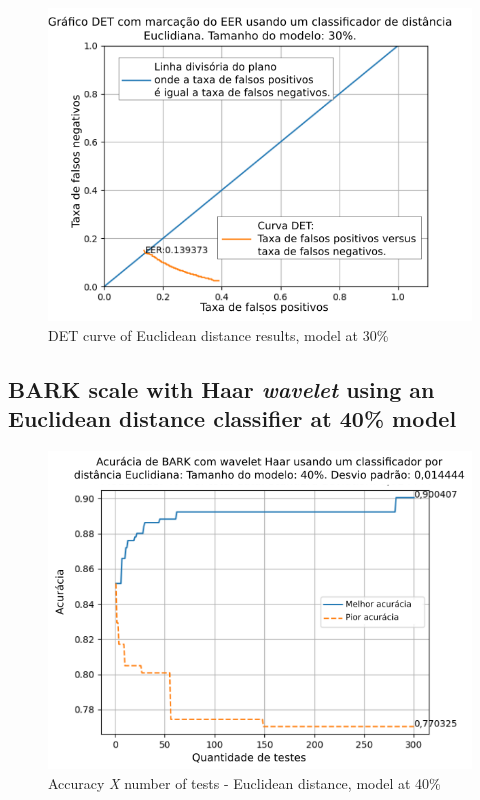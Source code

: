 \begin{figure}[ht]
	\centering
	\includegraphics[width=.9\linewidth]{images/results/det/DET_for_classifier_Euclidian_30}
	\caption{DET curve of Euclidean distance results, model at 30\%}
	\label{fig:detforclassifiereuclidian30}
\end{figure}

\subsection{BARK scale with Haar \textit{wavelet} using an Euclidean distance classifier at 40\% model}



\begin{figure}[ht]
	\centering
	\includegraphics[width=\linewidth]{images/results/confusionMatrices/classifier_Euclidian_40}
	\caption{Accuracy \textit{X} number of tests - Euclidean distance, model at 40\%}
	\label{fig:classifiereuclidian40}
\end{figure}

